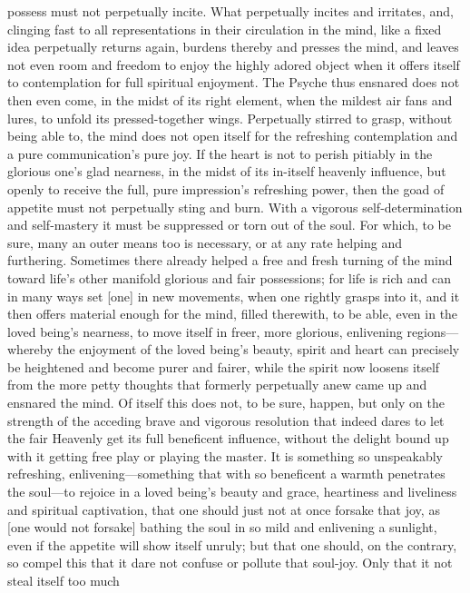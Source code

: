 \documentclass[12pt,a4paper]{book}
\begin{document}
possess must not perpetually incite. What perpetually incites and
irritates, and, clinging fast to all representations in their circulation
in the mind, like a fixed idea perpetually returns again, burdens thereby
and presses the mind, and leaves not even room and freedom to enjoy the
highly adored object when it offers itself to contemplation for full
spiritual enjoyment. The Psyche thus ensnared does not then even come, in
the midst of its right element, when the mildest air fans and lures, to
unfold its pressed-together wings. Perpetually stirred to grasp, without
being able to, the mind does not open itself for the refreshing
contemplation and a pure communication's pure joy. If the heart is not to
perish pitiably in the glorious one's glad nearness, in the midst of its
in-itself heavenly influence, but openly to receive the full, pure
impression's refreshing power, then the goad of appetite must not
perpetually sting and burn. With a vigorous self-determination and
self-mastery it must be suppressed or torn out of the soul. For which, to
be sure, many an outer means too is necessary, or at any rate helping and
furthering. Sometimes there already helped a free and fresh turning of the
mind toward life's other manifold glorious and fair possessions; for life
is rich and can in many ways set [one] in new movements, when one rightly
grasps into it, and it then offers material enough for the mind, filled
therewith, to be able, even in the loved being's nearness, to move itself
in freer, more glorious, enlivening regions---whereby the enjoyment of the
loved being's beauty, spirit and heart can precisely be heightened and
become purer and fairer, while the spirit now loosens itself from the more
petty thoughts that formerly perpetually anew came up and ensnared the
mind. Of itself this does not, to be sure, happen, but only on the strength
of the acceding brave and vigorous resolution that indeed dares to let the
fair Heavenly get its full beneficent influence, without the delight bound
up with it getting free play or playing the master. It is something so
unspeakably refreshing, enlivening---something that with so beneficent a
warmth penetrates the soul---to rejoice in a loved being's beauty and grace,
heartiness and liveliness and spiritual captivation, that one should just
not at once forsake that joy, as [one would not forsake] bathing the soul
in so mild and enlivening a sunlight, even if the appetite will show itself
unruly; but that one should, on the contrary, so compel this that it dare
not confuse or pollute that soul-joy. Only that it not steal itself too much
\end{document}
